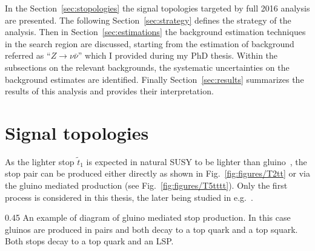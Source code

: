 In the Section~\ref{sec:stopologies} the signal topologies targeted by full 2016 analysis are presented. The following Section~\ref{sec:strategy} defines the strategy of the analysis.  Then in Section~\ref{sec:estimations} the background estimation techniques in the search region are discussed, starting from the estimation of background referred as ``$Z \to \nu \bar{\nu}$'' which I provided during my PhD thesis. Within the subsections on the relevant backgrounds, the systematic uncertainties on the background estimates are identified. Finally Section~\ref{sec:results} summarizes the results of this analysis and provides their interpretation. 







\section{Signal topologies~\label{sec:stopologies}}

As the lighter stop $\tilde{t}_{1}$ is expected in natural SUSY to be lighter than gluino~\cite{Martin:2008aw}, the stop pair can be produced either directly as shown in Fig.~\ref{fig:figures/T2tt} or via the gluino mediated production (see Fig.~\ref{fig:figures/T5tttt}). Only the first process is considered in this thesis, the later being studied in e.g.~\cite{Sirunyan:2017pjw, Sirunyan:2017kqq}.

                {0.45}       %
                { An example of diagram of gluino mediated stop production. In this case gluinos are produced in pairs and both decay to a top quark and a top squark. Both stops decay to a top quark and an LSP. } %

